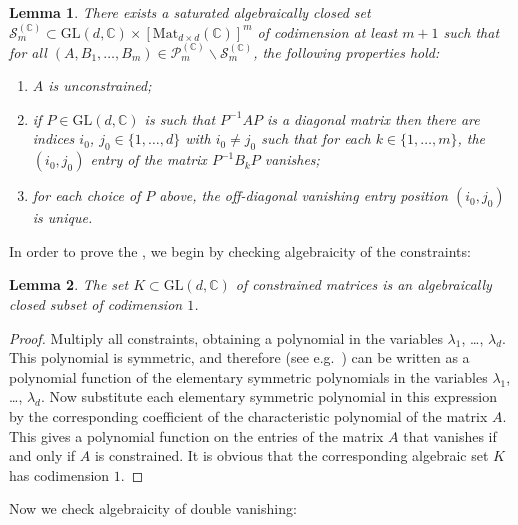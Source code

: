 \documentclass[10pt, a4paper]{amsart}
\theoremstyle{plain}
\newtheorem{lemma}{Lemma}[section]
\theoremstyle{definition}
\theoremstyle{remark}
\theoremstyle{note}
\numberwithin{equation}{section}
\begin{document}
\begin{lemma}\label{l.bad_set}
There exists a saturated algebraically closed set 
${\mathcal{S}}_m^{({\mathbb{C}})} \subset {\mathrm{GL}}(d,{\mathbb{C}})\times [{\mathrm{Mat}}_{d\times d}({\mathbb{C}})]^m$        
of codimension at least $m+1$
such that for all $(A, B_1, \dots, B_m) \in {\mathcal{P}}_m^{({\mathbb{C}})} {\smallsetminus} {\mathcal{S}}_m^{({\mathbb{C}})}$, the following properties hold:
\begin{enumerate}
\item\label{i.good_1}
$A$ is unconstrained;
\item\label{i.good_2}
if $P\in {\mathrm{GL}}(d,{\mathbb{C}})$ is such that $P^{-1} A P$ is a diagonal matrix then
there are indices $i_0$, $j_0 \in \{1,\dots,d\}$ with $i_0 \neq j_0$ 
such that for each $k \in \{1,\dots,m\}$, the $(i_0,j_0)$ entry of the matrix $P^{-1} B_k P$ vanishes;
\item\label{i.good_3}
for each choice of $P$ above,
the off-diagonal vanishing entry position $(i_0,j_0)$ is unique.
\end{enumerate}
\end{lemma}

\medskip

In order to prove the ,
we begin by checking algebraicity of the constraints:

\begin{lemma}\label{l.alg_constraint}
The set $K \subset {\mathrm{GL}}(d,{\mathbb{C}})$ of constrained matrices
is an algebraically closed subset of codimension $1$.
\end{lemma}

\begin{proof}
Multiply all constraints, obtaining a polynomial in the variables $\lambda_1$, \dots, $\lambda_d$.
This polynomial is symmetric, 
and therefore (see e.g.\ \cite[Thrm.~IV.6.1]{Lang})
can be written as a polynomial function of the elementary symmetric polynomials in the variables 
$\lambda_1$, \dots, $\lambda_d$.
Now substitute each elementary symmetric polynomial in this expression by the corresponding
coefficient of the characteristic polynomial of the matrix $A$.
This gives a polynomial function on the entries of the matrix $A$
that vanishes if and only if $A$ is constrained.
It is obvious that the corresponding algebraic set $K$ has codimension $1$.
\end{proof}

Now we check algebraicity of double vanishing:
\end{document}
